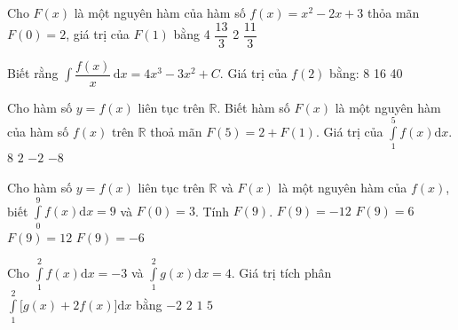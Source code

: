 \begin{ex}%
    Cho $F(x)$ là một nguyên hàm của hàm số $f(x)=x^2-2x+3$ thỏa mãn $F(0)=2$, giá trị của $F(1)$ bằng
    \choice
    {4}
    {\True $\dfrac{13}{3}$}
    {2}
    {$\dfrac{11}{3}$}
\end{ex}
\begin{ex}%
 Biết rằng $\displaystyle\int \dfrac{f(x)}{x} \,\text{d}x = 4x^3 - 3x^2 + C$. Giá trị của $f(2)$ bằng:
 \choice
 {}
 {8}
 {16}
 {40}
\end{ex}
\begin{ex}
 Cho hàm số $y=f(x)$ liên tục trên $\mathbb{R}$. Biết hàm số $F(x)$ là một nguyên hàm của hàm số $f(x)$ trên $\mathbb{R}$ thoả mãn $F(5) = 2 + F(1)$. Giá trị của $\int\limits_1^5 f(x)\mathrm{d}x$.
 \choice
 {$8$}
 {\True $2$}
 {$-2$}
 {$-8$}
\end{ex}
\begin{ex}
 Cho hàm số $y=f(x)$ liên tục trên $\mathbb{R}$ và $F(x)$ là một nguyên hàm của $f(x)$, biết $\int\limits_0^9 f(x)\mathrm{d}x = 9$ và $F(0) = 3$. Tính $F(9)$.
 \choice
 {$F(9) = -12$}
 {$F(9) = 6$}
 {\True $F(9) = 12$}
 {$F(9) = -6$}
\end{ex}
\begin{ex}
Cho $\int\limits_1^2 f(x)\mathrm{d}x = -3$ và $\int\limits_1^2 g(x)\mathrm{d}x = 4$. Giá trị tích phân $\int\limits_1^2 \big[g(x) + 2f(x)\big]\mathrm{d}x$ bằng
 \choice
 {\True $-2$}
 {$2$}
 {$1$}
 {$5$}
\end{ex}

